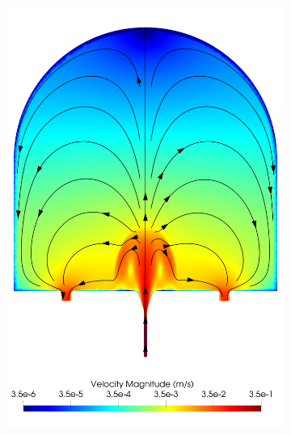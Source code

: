 \begin{figure}
\begin{subfigure}[b]{0.45\textwidth}
                    \includegraphics[width=\textwidth]{diagrams/results-modelling/velocity-transport/meshandsoln_dg_velocity_placentone_ns-b_velocity-log.png}
                    \caption{}
                    \label{fig:4-models-placentone:ns-b}
                \end{subfigure}
                \hfill
                \begin{subfigure}[b]{0.45\textwidth}
                    \centering

\end{subfigure}
\end{figure}
